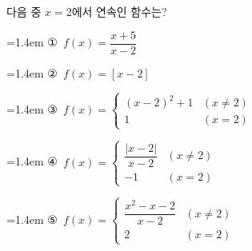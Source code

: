 다음 중 $x=2$에서 연속인 함수는? 
\par\medskip\par\noindent\hangindent=1.4em {\small ①}\ $f(x)=\dfrac{x+5}{x-2}$\par\noindent\hangindent=1.4em {\small ②}\ $f(x)=[x-2]$\par\noindent\hangindent=1.4em {\small ③}\ $f(x)=\begin{cases} (x-2)^2+1 & (x\ne 2) \\ 1 & (x=2) \end{cases}$\par\noindent\hangindent=1.4em {\small ④}\ $f(x)=\begin{cases} \dfrac{|x-2|}{x-2} & (x\ne 2) \\[1.5ex] -1 & (x=2) \end{cases}$\par\noindent\hangindent=1.4em {\small ⑤}\ $f(x)=\begin{cases} \dfrac{x^2-x-2}{x-2} & (x\ne 2) \\[1.5ex] 2 & (x=2) \end{cases}$\par\medskip
